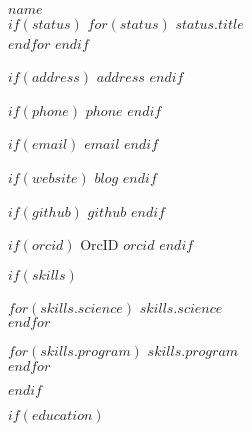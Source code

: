 \documentclass[$fontsize$, letterpaper]{article}
\begin{document}
\begin{multicols}{2}

{\Large \textbf{$name$}}\\[.2cm]
$if(status)$
$for(status)$
{\large{$status.title$}} \\
$endfor$
$endif$


\vspace*{.1cm}

$if(address)$
\faHome \quad $address$
$endif$

$if(phone)$
\faPhone \quad $phone$
$endif$

$if(email)$
\faEnvelope \quad \href{mailto:$email$}{$email$}
$endif$

$if(website)$
\faGlobe \quad \href{http://$blog$}{$blog$}
$endif$

$if(github)$
\faGithub \quad \href{https://github.com/$github$}{$github$}
$endif$

$if(orcid)$
OrcID \quad \href{http://orcid.org/$orcid$}{$orcid$}
$endif$



$if(skills)$

\columnbreak


\vspace{-.4cm}

\setlength{\columnsep}{0cm}
\begin{multicols}{2}

$for(skills.science)$
$skills.science$\\
$endfor$
\end{multicols}


\vspace{-.2cm}

\vspace{-.4cm}

\begin{multicols}{2}

$for(skills.program)$
$skills.program$\\
$endfor$
\end{multicols}

$endif$
\end{multicols}




$if(education)$
\end{document}

